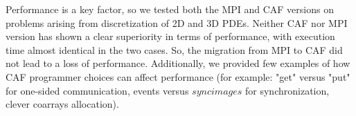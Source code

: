 \documentclass{IOS-Book-Article}
\begin{document}
Performance is a key factor, so we tested both the MPI and CAF versions on problems arising from discretization of 2D and 3D PDEs. Neither CAF nor MPI version has shown a clear superiority in terms of performance, with execution time almost identical in the two cases. So, the migration from MPI to CAF did not lead to a loss of performance.
Additionally, we provided few examples of how CAF programmer choices can affect performance (for example: "get" versus "put" for one-sided communication, events versus $sync images$ for synchronization, clever coarrays allocation).
  
 
 


\end{document}
